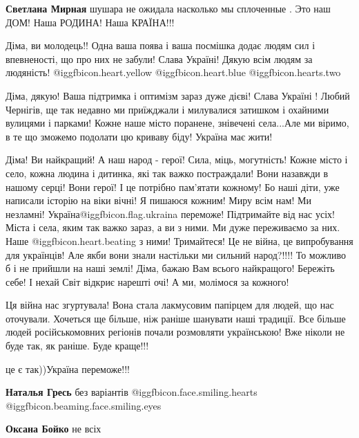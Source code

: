\begin{itemize}
\begin{itemize}
\textbf{Светлана Мирная} шушара не ожидала насколько мы сплоченные . Это наш ДОМ! Наша РОДИНА! Наша КРАЇНА!!!
\end{itemize} %


Діма, ви молодець!! Одна ваша поява і ваша посмішка додає людям сил і
впевненості, що про них не забули! Слава Україні! Дякую всім людям за
людяність! @igg{fbicon.heart.yellow}  @igg{fbicon.heart.blue}  @igg{fbicon.hearts.two} 


Діма, дякую! Ваша підтримка і оптимізм зараз дуже дієві! Слава Україні ! Любий
Чернігів, ще так недавно ми приїжджали і милувалися затишком і охайними
вулицями і парками! Кожне наше місто поранене, знівечені села...Але ми віримо, в
те що зможемо подолати цю криваву біду! Україна має жити!


Діма! Ви найкращий! А наш народ - герої! Сила, міць, могутність! Кожне місто і
село, кожна людина і дитинка, які так важко постраждали! Вони назавжди в нашому
серці! Вони герої! І це потрібно пам'ятати кожному! Бо наші діти, уже написали
історію на віки вічні! Я пишаюся кожним! Миру всім нам! Ми незламні!
Україна@igg{fbicon.flag.ukraina} переможе! Підтримайте від нас усіх! Міста і села, яким так важко
зараз, а ви з ними. Ми дуже переживаємо за них. Наше  @igg{fbicon.heart.beating}  з ними! Тримайтеся! Це
не війна, це випробування для українців! Але якби вони знали настільки ми
сильний народ?!!!! То можливо б і не прийшли на наші землі! Діма, бажаю Вам
всього найкращого! Бережіть себе! І нехай Світ відкриє нарешті очі! А ми,
молімося за кожного!


Ця війна нас згуртувала! Вона стала лакмусовим папірцем для людей, що нас
оточували.  Хочеться ще більше, ніж раніше шанувати наші традиції. Все більше
людей російськомовних регіонів почали розмовляти українською!  Вже ніколи не
буде так, як раніше. Буде краще!!!

\begin{itemize} %
це є так))Україна переможе!!!

\textbf{Наталья Гресь} без варіантів  @igg{fbicon.face.smiling.hearts}  @igg{fbicon.beaming.face.smiling.eyes} 

\textbf{Оксана Бойко} не всіх


\end{itemize}
\end{itemize}
